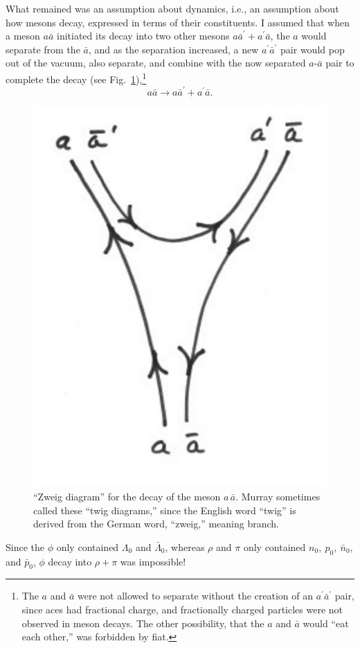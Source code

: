 \documentclass[12pt]{article}
\begin{document}
What remained was an assumption about dynamics, i.e., an assumption about how mesons decay, expressed in terms of their constituents. I assumed that when a meson $a\bar a$ initiated its decay into two other mesons $a\bar a^{'} + a^{'}\bar a$, the $a$ would separate from the $\bar a$, and as the separation increased, a new $a^{'}\bar a^{'}$  pair would pop out of the vacuum, also separate, and combine with the now separated $a$-$\bar a$ pair to complete the decay (see Fig.~\ref{fig:branchGraph}),\footnote{The $a$ and $\bar a$ were not allowed to separate without the creation of an $a^\prime \bar a^\prime$ pair, since aces had fractional charge, and fractionally charged particles were not observed in meson decays. The other possibility, that the $a$ and $\bar a$ would ``eat each other,'' was forbidden by fiat.}
$$
a\bar a \rightarrow a\bar a^{'} + a^{'}\bar a.
$$
\begin{figure}
   \centering
   \includegraphics [scale=.5] {branchGraphA}
   \caption{``Zweig diagram'' for the decay of the meson $a\,\bar a$. Murray sometimes called these ``twig diagrams,'' since the English word ``twig'' is derived from the German word, ``zweig,'' meaning branch.
   }
   \label{fig:branchGraph}
\end{figure}
Since the $\phi$ only contained $\Lambda_0$ and $\bar\Lambda_0$, whereas $\rho$ and $\pi$ only contained $n_0,\ p_0,\ \bar n_0,$ and $\bar p_0$,  $\phi$ decay into $\rho + \pi$ was impossible!
\end{document}

